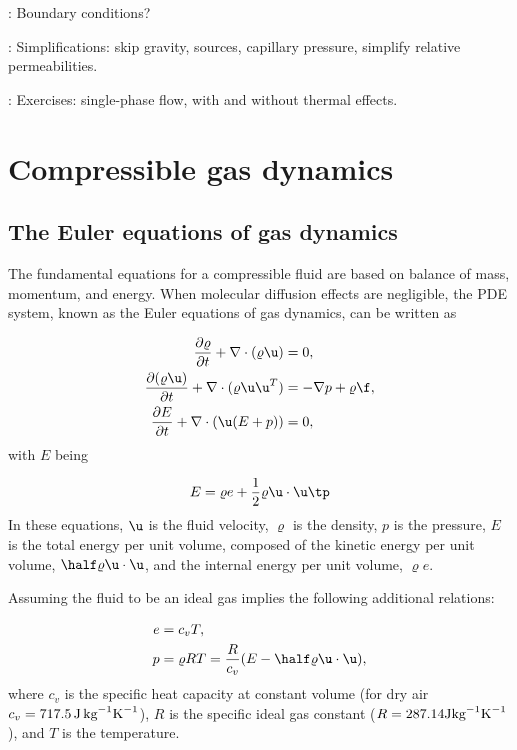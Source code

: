 \documentclass[graybox,envcountchap,sectrefs,final]{svmonodo}
\newcommand{\shortinlinecomment}[3]{{\color{red}{\bf #1}: #2}}
\begin{document}
\shortinlinecomment{hpl 5}{ Boundary conditions? }{ Boundary conditions? }

\shortinlinecomment{hpl 6}{ Simplifications: skip gravity, sources, capillary pressure, simplify relative permeabilities. }{ Simplifications: skip gravity, sources, }

\shortinlinecomment{hpl 7}{ Exercises: single-phase flow, with and without thermal effects. }{ Exercises: single-phase flow, with }

\section{Compressible gas dynamics}
\label{scale:gasdyn}

\subsection{The Euler equations of gas dynamics}
\label{scale:Euler_eqs}



The fundamental equations for a compressible fluid are based on balance
of mass, momentum, and energy. When molecular diffusion effects are
negligible, the PDE system, known as the Euler
equations of gas dynamics, can be written as

\begin{align}
\frac{\partial\varrho}{\partial t} + \nabla\cdot(\varrho\u) &= 0,
\label{scale:Euler_eqs:mass}\\ 
\frac{\partial(\varrho\u)}{\partial t} + \nabla\cdot(\varrho\u\u^T) &= -\nabla p + \varrho \f,
\label{scale:Euler_eqs:mom}\\ 
\frac{\partial E}{\partial t} + \nabla\cdot(\u(E+p)) &= 0,
\label{scale:Euler_eqs:energy}
\end{align}
with $E$ being

\begin{equation}
E = \varrho e + \frac{1}{2}\varrho\u\cdot\u\tp
\label{scale:Euler_eqs:E}
\end{equation}
In these equations, $\u$ is the fluid velocity, $\varrho$ is the density,
$p$ is the pressure, $E$ is the total energy per unit volume, composed
of the kinetic energy per unit volume, $\half\varrho \u\cdot\u$, and the
internal energy per unit volume, $\varrho e$.

Assuming the fluid to be an ideal gas implies the following additional
relations:

\begin{align}
e &= c_v T,
\label{scale:Euler_eqs:e}\\ 
p &= \varrho RT = \frac{R}{c_v}(E-\half\varrho \u\cdot\u),
\label{scale:Euler_eqs:p}
\end{align}
where $c_v$ is the specific heat capacity at constant volume (for dry air
$c_v = 717.5\, \hbox{J}\,\hbox{kg}^{-1}\hbox{K}^{-1}$),
$R$ is the specific ideal gas constant
($R=287.14 \hbox{J}\hbox{kg}^{-1}\hbox{K}^{-1}$), and $T$ is the temperature.
\end{document}
